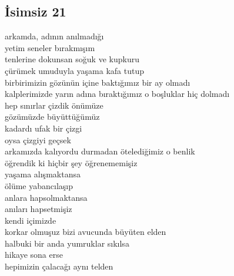 \subsection{İsimsiz 21}

arkamda, adının anılmadığı \\
yetim seneler bırakmışım \\
tenlerine dokunsan soğuk ve kupkuru \\
çürümek umuduyla yaşama kafa tutup \\
birbirimizin gözünün içine baktığımız bir ay olmadı \\
kalplerimizde yarın adına bıraktığımız o boşluklar hiç dolmadı \\

\noindent\newline
hep sınırlar çizdik önümüze \\
gözümüzde büyüttüğümüz \\
kadardı ufak bir çizgi \\
oysa çizgiyi geçsek \\
arkamızda kalıyordu durmadan ötelediğimiz o benlik \\

\noindent\newline
öğrendik ki hiçbir şey öğrenememişiz \\
yaşama alışmaktansa \\
ölüme yabancılaşıp \\
anlara hapsolmaktansa \\
anıları hapsetmişiz \\
kendi içimizde \\

\noindent\newline
korkar olmuşuz bizi avucunda büyüten elden \\
halbuki bir anda yumruklar sıkılsa \\
hikaye sona erse \\
hepimizin çalacağı aynı telden \\